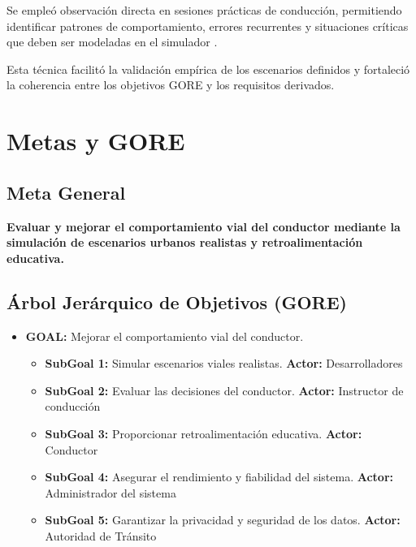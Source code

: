 \documentclass[12pt]{article}
\begin{document}
	Se empleó observación directa en sesiones prácticas de conducción, permitiendo identificar patrones de comportamiento, errores recurrentes y situaciones críticas que deben ser modeladas en el simulador \cite{Nicolosi2025}.
	
	Esta técnica facilitó la validación empírica de los escenarios definidos y fortaleció la coherencia entre los objetivos GORE y los requisitos derivados.
	
	\section{Metas y GORE}
	
	\subsection{Meta General}
	\textbf{Evaluar y mejorar el comportamiento vial del conductor mediante la simulación de escenarios urbanos realistas y retroalimentación educativa.}
	
	\subsection{Árbol Jerárquico de Objetivos (GORE)}
	
	\begin{itemize}
		\item \textbf{GOAL:} Mejorar el comportamiento vial del conductor.
		\begin{itemize}
			\item \textbf{SubGoal 1:} Simular escenarios viales realistas.  
			\textbf{Actor:} Desarrolladores
			
			\item \textbf{SubGoal 2:} Evaluar las decisiones del conductor.  
			\textbf{Actor:} Instructor de conducción
			
			\item \textbf{SubGoal 3:} Proporcionar retroalimentación educativa.  
			\textbf{Actor:} Conductor
			
			\item \textbf{SubGoal 4:} Asegurar el rendimiento y fiabilidad del sistema.  
			\textbf{Actor:} Administrador del sistema
			
			\item \textbf{SubGoal 5:} Garantizar la privacidad y seguridad de los datos.  
			\textbf{Actor:} Autoridad de Tránsito
		\end{itemize}
	\end{itemize}
	
\end{document}
